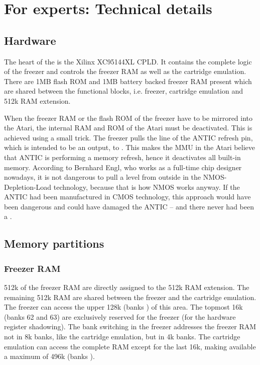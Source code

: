 \chapter{For experts: Technical details}

\section{Hardware}
The heart of the \frz is the Xilinx XC95144XL CPLD. It contains the complete
logic of the freezer and controls the freezer RAM as well as the cartridge
emulation. There are 1MB flash ROM and 1MB battery backed freezer RAM present
which are shared between the functional blocks, i.e. freezer, cartridge
emulation and 512k RAM extension.

When the freezer RAM or the flash ROM of the freezer have to be mirrored into
the Atari, the internal RAM and ROM of the Atari must be deactivated. This is
achieved using a small trick. The freezer pulls the line of the ANTIC refresh
pin, which is intended to be an output, to . This makes the MMU in
the Atari believe that ANTIC is performing a memory refresh, hence it
deactivates all built-in memory.
According to Bernhard Engl, who works as a full-time chip designer nowadays, it
is not dangerous to pull a  level  from outside in the
NMOS-Depletion-Load technology, because that is how NMOS works anyway.
If the ANTIC had been manufactured in CMOS technology, this approach would have
been dangerous and could have damaged the ANTIC -- and there never had been a
\frz.

\section{Memory partitions}

\subsection{Freezer RAM}
512k of the freezer RAM are directly assigned to the 512k RAM extension.
The remaining 512k RAM are shared between the freezer and the cartridge
emulation. The freezer can access the upper 128k (banks ) of this
area. The topmost 16k (banks 62 and 63) are exclusively reserved for the freezer
(\ie for the hardware register shadowing). The bank switching in the freezer
addresses the freezer RAM not in 8k banks, like the cartridge emulation, but in
4k banks. The cartridge emulation can access the complete RAM except for the
last 16k, making available a maximum of 496k (banks ).

